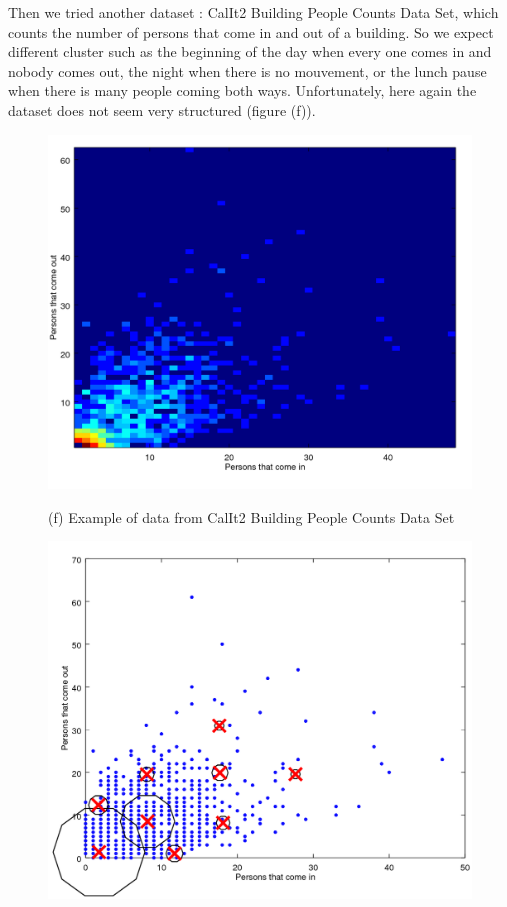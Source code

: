 \documentclass[10pt,a4paper]{report}
\begin{document}
\newpage
Then we tried another dataset : CalIt2 Building People Counts Data Set, which counts the number of persons that come in and out of a building. So we expect different cluster such as the beginning of the day when every one comes in and nobody comes out, the night when there is no mouvement, or the lunch pause when there is many people coming both ways. Unfortunately, here again the dataset does not seem very structured (figure (f)).

\begin{figure}[h]
	\begin{minipage}[b]{.48\linewidth}
		\vspace{10pt}
		\includegraphics[width=1.0\textwidth]{building.png}
		\begin{center}
			\large{(f) Example of data from CalIt2 
			Building People Counts Data Set}
		\end{center}\medskip
	\end{minipage}
	\hfill
	\begin{minipage}[b]{0.48\linewidth}
		\includegraphics[width=1.0\textwidth]{expe4.png}

\end{minipage}
\end{figure}
\end{document}
